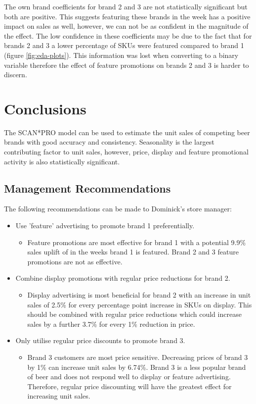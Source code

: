 \documentclass[a4paper,11pt]{article}
\begin{document}
The own brand coefficients for brand 2 and 3 are not statistically significant but both are positive. This suggests featuring these brands in the week has a positive impact on sales as well, however, we can not be as confident in the magnitude of the effect. The low confidence in these coefficients may be due to the fact that for brands 2 and 3 a lower percentage of SKUs were featured compared to brand 1 (figure \ref{fig:eda-plots}). This information was lost when converting to a binary variable therefore the effect of feature promotions on brands 2 and 3 is harder to discern.


\section{Conclusions}

The SCAN*PRO model can be used to estimate the unit sales of competing beer brands with good accuracy and consistency. Seasonality is the largest contributing factor to unit sales, however, price, display and feature promotional activity is also statistically significant. 

\subsection{Management Recommendations}
The following recommendations can be made to Dominick's store manager:
\begin{itemize}
    \item Use 'feature' advertising to promote brand 1 preferentially.
    \begin{itemize}
        \item Feature promotions are most effective for brand 1 with a potential 9.9\% sales uplift of in the weeks brand 1 is featured. Brand 2 and 3 feature promotions are not as effective.
    \end{itemize}
    \item Combine display promotions with regular price reductions for brand 2.
    \begin{itemize}
        \item Display advertising is most beneficial for brand 2 with an increase in unit sales of 2.5\% for every percentage point increase in SKUs on display. This should be combined with regular price reductions which could increase sales by a further 3.7\% for every 1\% reduction in price.
    \end{itemize}
    \item Only utilise regular price discounts to promote brand 3.
    \begin{itemize}
        \item Brand 3 customers are most price sensitive. Decreasing prices of brand 3 by 1\% can increase unit sales by 6.74\%. Brand 3 is a less popular brand of beer and does not respond well to display or feature advertising. Therefore, regular price discounting will have the greatest effect for increasing unit sales. 
    \end{itemize}
    

\end{itemize}
\end{document}
